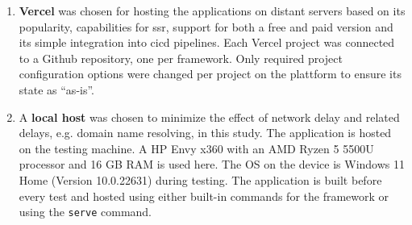 \documentclass[a4paper, 12pt]{article}
\begin{document}
\begin{enumerate}
  \item \textbf{Vercel} was chosen for hosting the applications on distant servers based on its popularity, capabilities for \acrfull{ssr}, support for both a free and paid version and its simple integration into \acrshort{cicd} pipelines.
  Each Vercel project was connected to a Github repository, one per framework.
  Only required project configuration options were changed per project on the plattform to ensure its state as \enquote{as-is}.
  \item A \textbf{local host} was chosen to minimize the effect of network delay and related delays, e.g. domain name resolving, in this study.
  The application is hosted on the testing machine.
  A HP Envy x360 with an AMD Ryzen 5 5500U processor and 16 GB RAM is used here.
  The OS on the device is Windows 11 Home (Version 10.0.22631) during testing.
  The application is built before every test and hosted using either built-in commands for the framework or using the \verb|serve| command. %
\end{enumerate}

\end{document}
